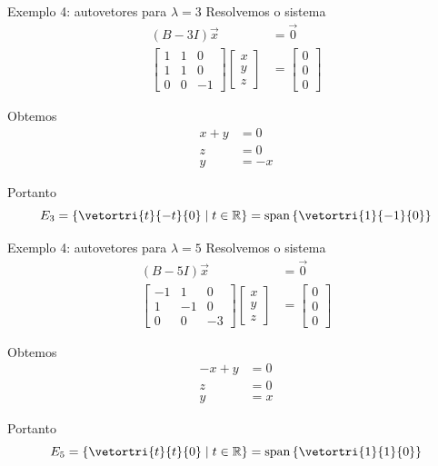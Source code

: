 \begin{frame}{Exemplo 4: autovetores para $\lambda=3$}
    Resolvemos o sistema
    \begin{align*}
        (B-3I)\vec{x}&=\vec{0}\\
        \begin{bmatrix}
            1 & 1 & 0\\
            1 & 1 & 0\\
            0 & 0 & -1
        \end{bmatrix}
        \begin{bmatrix}
            x\\y\\z
        \end{bmatrix}
        &=
        \begin{bmatrix}
            0\\0\\0
        \end{bmatrix}
    \end{align*}

    Obtemos
    \begin{align*}
        x+y&=0\\
        z&=0\\
        y&=-x
    \end{align*}

    Portanto
    \[
        E_{3}=
        \left\{
            \vetortri{t}{-t}{0}
            \mid t\in\mathbb{R}
        \right\}
        =
        \operatorname{span}
        \left\{\vetortri{1}{-1}{0}\right\}
    \]
\end{frame}

\begin{frame}{Exemplo 4: autovetores para $\lambda=5$}
    Resolvemos o sistema
    \begin{align*}
        (B-5I)\vec{x}&=\vec{0}\\
        \begin{bmatrix}
            -1 & 1 & 0\\
            1 & -1 & 0\\
            0 & 0 & -3
        \end{bmatrix}
        \begin{bmatrix}
            x\\y\\z
        \end{bmatrix}
        &=
        \begin{bmatrix}
            0\\0\\0
        \end{bmatrix}
    \end{align*}

    Obtemos
    \begin{align*}
        -x+y&=0\\
        z&=0\\
        y&=x
    \end{align*}

    Portanto
    \[
        E_{5}=
        \left\{
            \vetortri{t}{t}{0}
            \mid t\in\mathbb{R}
        \right\}
        =
        \operatorname{span}
        \left\{\vetortri{1}{1}{0}\right\}
    \]
\end{frame}

